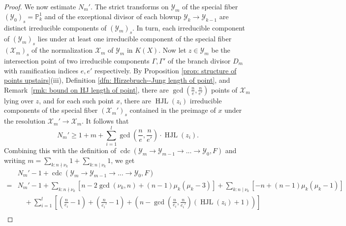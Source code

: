 \documentclass[12pt]{amsart}
\numberwithin{equation}{section}
\theoremstyle{definition}
\renewcommand{\P}{\mathbb P}
\renewcommand{\phi}{\varphi}
\newcommand{\X}{\mathcal{X}}
\newcommand{\Y}{\mathcal{Y}}
\DeclareMathOperator{\disc}{disc}
\DeclareMathOperator{\Art}{Art}
\DeclareMathOperator{\cdc}{cdc}
\DeclareMathOperator{\HJL}{HJL}
\begin{document}
\begin{proof}
   We now estimate $N_m'$. The strict transforms on $\Y_m$ of the
   special fiber $(\Y_0)_s=\P^1_k$ and of the exceptional divisor of
   each blowup $\Y_k\to\Y_{k-1}$ are distinct irreducible components
   of $(\Y_m)_s$. In turn, each irreducible component of $(\Y_m)_s$
   lies under at least one irreducible component of the special fiber
   $(\X_m)_s$ of the normalization $\X_m$ of $\Y_m$ in $K(X)$. Now let
   $z\in \Y_m$ be the intersection point of two irreducible components
   $\Gamma,\Gamma'$ of the branch divisor $D_m$ with ramification
   indices $e,e'$ respectively. By Proposition \ref{prop: structure of
     points upstairs}(iii), Definition \ref{dfn: Hirzebruch--Jung
     length of point}, and Remark~\ref{rmk: bound on HJ length of point}, there are $\gcd(\frac{n}{e},\frac{n}{e'})$
   points of $\X_m$ lying over $z$, and for each such point $x$,
   there are $\HJL(z_i)$ irreducible components of the special fiber $(\X_m')_s$ contained in the preimage of $x$ under the resolution $\X_m'\to\X_m$. It follows that
    \[N_m'\geq 1+m+\sum_{i=1}^l\gcd \left(\frac{n}{e},\frac{n}{e'} \right)\cdot\HJL(z_i). \]
    Combining this with the definition of $\cdc(\Y_m\to\Y_{m-1}\to...\to\Y_0, F)$ and writing $m = \sum_{k \colon n \nmid \nu_k} 1 + \sum_{k \colon n \mid \nu_k} 1$, we get
    \begin{align*}
        &N_m'-1+\cdc(\Y_m\to\Y_{m-1}\to...\to\Y_0, F)\\=& N_m'-1+\sum_{k:n\nmid\nu_k}[n-2\gcd(\nu_k,n)+(n-1)\mu_k(\mu_k-3)]+\sum_{k:n\mid\nu_k}[-n+(n-1)\mu_k(\mu_k-1)]\\
        &\quad+\sum_{i=1}^l \left[ \left(\frac{n}{e_i}-1 \right)+ \left(\frac{n}{e_i'}-1 \right)+\left(n-\gcd \left(\frac{n}{e_i},\frac{n}{e_i'} \right)(\HJL(z_i)+1) \right) \right]\\

\end{align*}
\end{proof}
\end{document}
